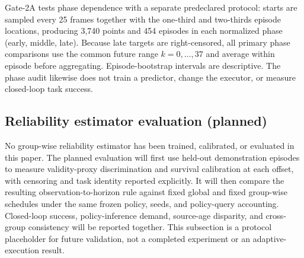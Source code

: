 Gate-2A tests phase dependence with a separate predeclared protocol: starts are
sampled every 25 frames together with the one-third and two-thirds episode
locations, producing 3,740 points and 454 episodes in each normalized phase
(early, middle, late).  Because late targets are right-censored, all primary
phase comparisons use the common future range $k=0,\ldots,37$ and average within
episode before aggregating.  Episode-bootstrap intervals are descriptive.  The
phase audit likewise does not train a predictor, change the executor, or measure
closed-loop task success.

\subsection{Reliability estimator evaluation (planned)}

No group-wise reliability estimator has been trained, calibrated, or evaluated
in this paper.  The planned evaluation will first use held-out demonstration
episodes to measure validity-proxy discrimination and survival calibration at
each offset, with censoring and task identity reported explicitly.  It will
then compare the resulting observation-to-horizon rule against fixed global and
fixed group-wise schedules under the same frozen policy, seeds, and policy-query
accounting.  Closed-loop success, policy-inference demand, source-age disparity,
and cross-group consistency will be reported together.  This subsection is a
protocol placeholder for future validation, not a completed experiment or an
adaptive-execution result.
